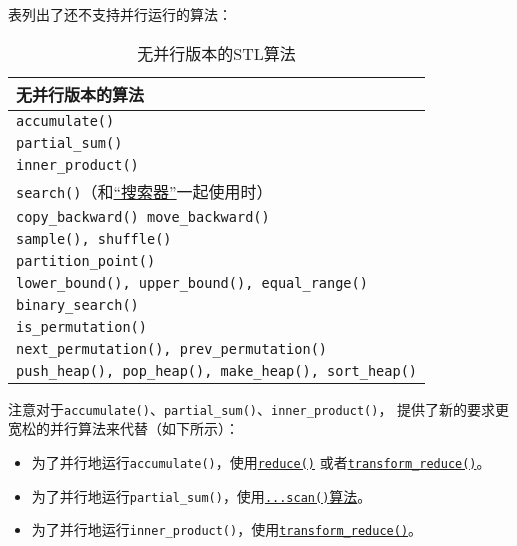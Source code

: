 表列出了还不支持并行运行的算法：
\begin{table}[htb]
    \centering
    \begin{tabular}{l}
        \hline
        \textbf{无并行版本的算法}                                              \\
        \hline
        \texttt{accumulate()}                                          \\
        \texttt{partial\_sum()}                                        \\
        \texttt{inner\_product()}                                      \\
        \texttt{search()}（和\hyperref[ch24]{“搜索器”}一起使用时）                \\
        \texttt{copy\_backward() move\_backward()}                     \\
        \texttt{sample(), shuffle()}                                   \\
        \texttt{partition\_point()}                                    \\
        \texttt{lower\_bound(), upper\_bound(), equal\_range()}        \\
        \texttt{binary\_search()}                                      \\
        \texttt{is\_permutation()}                                     \\
        \texttt{next\_permutation(), prev\_permutation()}              \\
        \texttt{push\_heap(), pop\_heap(), make\_heap(), sort\_heap()} \\
        \hline
    \end{tabular}
    \caption{无并行版本的STL算法}
    \label{t22.3}
\end{table}

注意对于\texttt{accumulate()}、\texttt{partial\_sum()}、\texttt{inner\_product()}，
提供了新的要求更宽松的并行算法来代替（如下所示）：
\begin{itemize}
    \item 为了并行地运行\texttt{accumulate()}，使用\hyperref[ch23.2.1]{\texttt{reduce()}}
    或者\hyperref[ch23.2.2]{\texttt{transform\_reduce()}}。
    \item 为了并行地运行\texttt{partial\_sum()}，使用\hyperref[ch23.2.3]{\texttt{...scan()}算法}。
    \item 为了并行地运行\texttt{inner\_product()}，使用\hyperref[ch23.2.2.2]{\texttt{transform\_reduce()}}。
\end{itemize}

